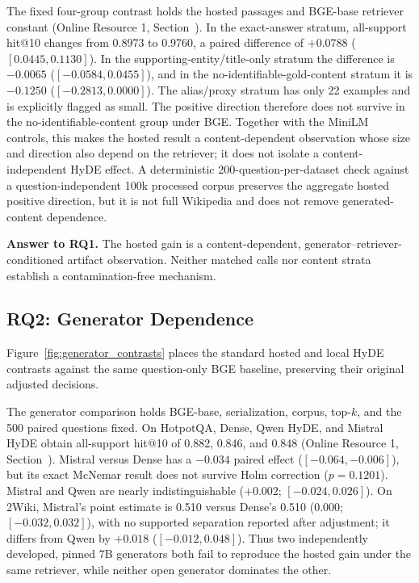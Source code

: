 The fixed four-group contrast holds the hosted passages and BGE-base retriever constant (Online Resource 1, Section~). In the exact-answer stratum, all-support hit@10 changes from 0.8973 to 0.9760, a paired difference of $+0.0788$ ($[0.0445,0.1130]$). In the supporting-entity/title-only stratum the difference is $-0.0065$ ($[-0.0584,0.0455]$), and in the no-identifiable-gold-content stratum it is $-0.1250$ ($[-0.2813,0.0000]$). The alias/proxy stratum has only 22 examples and is explicitly flagged as small. The positive direction therefore does not survive in the no-identifiable-content group under BGE. Together with the MiniLM controls, this makes the hosted result a content-dependent observation whose size and direction also depend on the retriever; it does not isolate a content-independent HyDE effect. A deterministic 200-question-per-dataset check against a question-independent 100k processed corpus preserves the aggregate hosted positive direction, but it is not full Wikipedia and does not remove generated-content dependence.

\noindent\textbf{Answer to RQ1.} The hosted gain is a content-dependent, generator--retriever-conditioned artifact observation. Neither matched calls nor content strata establish a contamination-free mechanism.

\subsection{RQ2: Generator Dependence}
\label{sec:rq2_generator_dependence}

Figure~\ref{fig:generator_contrasts} places the standard hosted and local HyDE contrasts against the same question-only BGE baseline, preserving their original adjusted decisions.

The generator comparison holds BGE-base, serialization, corpus, top-$k$, and the 500 paired questions fixed. On HotpotQA, Dense, Qwen HyDE, and Mistral HyDE obtain all-support hit@10 of 0.882, 0.846, and 0.848 (Online Resource 1, Section~). Mistral versus Dense has a $-0.034$ paired effect ($[-0.064,-0.006]$), but its exact McNemar result does not survive Holm correction ($p=0.1201$). Mistral and Qwen are nearly indistinguishable ($+0.002$; $[-0.024,0.026]$). On 2Wiki, Mistral's point estimate is 0.510 versus Dense's 0.510 ($0.000$; $[-0.032,0.032]$), with no supported separation reported after adjustment; it differs from Qwen by $+0.018$ ($[-0.012,0.048]$). Thus two independently developed, pinned 7B generators both fail to reproduce the hosted gain under the same retriever, while neither open generator dominates the other.

